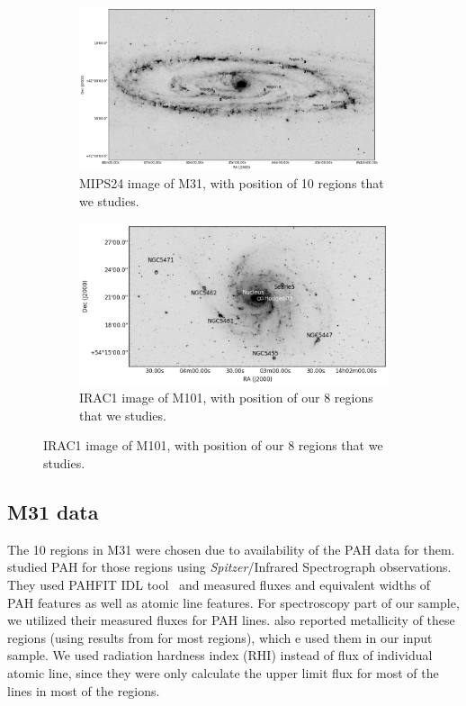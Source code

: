 \begin{figure}
   \begin{subfigure}[b]{0.5\textwidth}
        \centering
        \includegraphics[width=0.97\textwidth]{../images/M31/M31_3.png}
        \caption{MIPS24 image of M31, with position of 10 regions that we studies.}
        \label{fig: regions in m31}
    \end{subfigure}
    \hfill
    \begin{subfigure}[b]{0.5\textwidth}
        \includegraphics[width=\textwidth]{../images/M101/M101.png}
        \caption{IRAC1 image of M101, with position of our 8 regions that we studies.}
    \label{fig: regions in m101}
    \end{subfigure}
\end{figure}

    \subsection{M31 data}
      
     
     The 10 regions in M31 were chosen due to availability of the PAH data for them. 
     \cite{Dim15} studied PAH for those regions using {\it Spitzer}/Infrared Spectrograph\citep[IRS,][]{Houck04b} observations. 
     They used {\tiny PAHFIT IDL} tool~\citep{Smith07b} and measured fluxes and equivalent widths of PAH features as well as atomic line features.
     For spectroscopy part of our sample, we utilized their measured fluxes for PAH lines. 
     \cite{Dim15} also reported metallicity of these regions (using results from \cite{Sanders12} for most regions), which e used them in our input sample.
     We used radiation hardness index (RHI) instead of flux of individual atomic line, since they were only calculate the upper limit flux for most of the lines in most of the regions.
     
